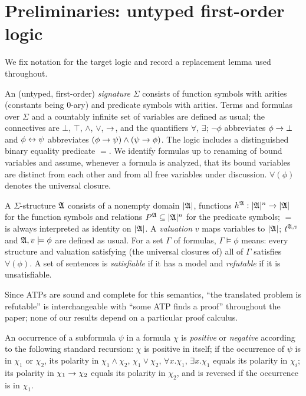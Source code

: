 \section{Preliminaries: untyped first-order logic}
\label{sec:prelim}

We fix notation for the target logic and record a replacement lemma used
throughout.

\begin{definition}[Syntax]
  \label{def:fol-syntax}
  An (untyped, first-order) \emph{signature} $\Sigma$ consists of function
  symbols with arities (constants being $0$-ary) and predicate symbols with
  arities.  Terms and formulas over $\Sigma$ and a countably infinite set of
  variables are defined as usual; the connectives are $\bot$, $\top$,
  $\wedge$, $\vee$, $\imp$, and the quantifiers $\forall$, $\exists$;
  $\neg\phi$ abbreviates $\phi \imp \bot$ and $\phi \biimp \psi$ abbreviates
  $(\phi \imp \psi) \wedge (\psi \imp \phi)$.  The logic includes a
  distinguished binary equality predicate $=$.  We identify formulas up to
  renaming of bound variables and assume, whenever a formula is analyzed,
  that its bound variables are distinct from each other and from all free
  variables under discussion.  $\forall(\phi)$ denotes the universal closure.
\end{definition}

\begin{definition}[Semantics]
  \label{def:fol-semantics}
  A $\Sigma$-structure $\AA$ consists of a nonempty domain $|\AA|$,
  functions $h^{\AA} : |\AA|^n \arr |\AA|$ for the function symbols and
  relations $P^{\AA} \subseteq |\AA|^n$ for the predicate symbols; $=$ is
  always interpreted as identity on $|\AA|$.  A \emph{valuation} $v$ maps
  variables to $|\AA|$; $\den{t}{\AA,v}$ and $\AA,v \models \phi$ are
  defined as usual.  For a set $\Gamma$ of formulas, $\Gamma \models \phi$
  means: every structure and valuation satisfying (the universal closures
  of) all of $\Gamma$ satisfies $\forall(\phi)$.  A set of sentences is
  \emph{satisfiable} if it has a model and \emph{refutable} if it is
  unsatisfiable.
\end{definition}

Since ATPs are sound and complete for this semantics, ``the translated
problem is refutable'' is interchangeable with ``some ATP finds a proof''
throughout the paper; none of our results depend on a particular proof
calculus.

\begin{definition}[Polarity]
  \label{def:polarity}
  An occurrence of a subformula $\psi$ in a formula $\chi$ is
  \emph{positive} or \emph{negative} according to the following standard
  recursion: $\chi$ is positive in itself; if the occurrence of
  $\psi$ is in $\chi_1$ or $\chi_2$, its polarity in
  $\chi_1 \wedge \chi_2$, $\chi_1 \vee \chi_2$, $\forall x.\chi_1$,
  $\exists x.\chi_1$ equals its polarity in $\chi_i$; its polarity in
  $\chi_1 \imp \chi_2$ equals its polarity in $\chi_2$, and is reversed if
  the occurrence is in $\chi_1$.
\end{definition}

